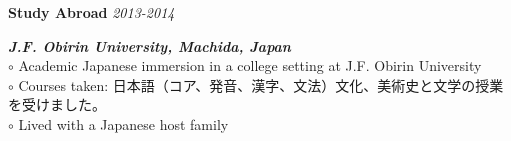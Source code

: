 \documentclass[twoside]{article}
\begin{document}
\begin{adjustwidth}{0.2in}{0in}
\textbf{Study Abroad} \hfill \textit{2013-2014}\\
\end{adjustwidth}
\vspace{-1em}
\begin{adjustwidth}{0.4in}{0in}
\textbf{\emph{J.F. Obirin University, Machida, Japan}}\\
$\circ$ Academic Japanese immersion in a college setting at J.F. Obirin University\\
$\circ$ Courses taken: 日本語（コア、発音、漢字、文法）文化、美術史と文学の授業を受けました。\\
$\circ$ Lived with a Japanese host family\\
\end{adjustwidth}
\end{document}
